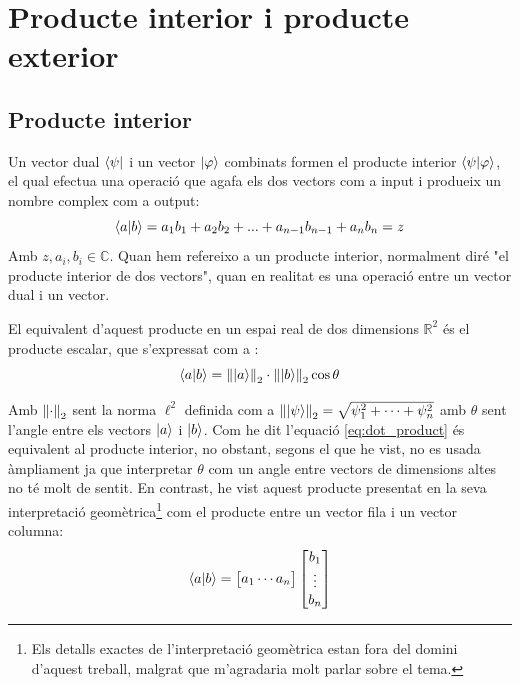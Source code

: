 \section{Producte interior i producte exterior}

\subsection{Producte interior}
Un vector dual $\bra{\psi}$ i un vector $\ket{\varphi}$ combinats formen el producte interior $\bra{\psi}\ket{\varphi}$, el qual efectua una operació que agafa els dos vectors com a input i produeix un nombre complex com a output:
$$
\bra{a}\ket{b} = a_1 b_1 + a_2 b_2 + ... + a_{n-1} b_{n-1} + a_n b_n = z
$$
Amb $z, a_i, b_i \in \mathbb{C}$. Quan hem refereixo a un producte interior, normalment diré "el producte interior de dos vectors", quan en realitat es una operació entre un vector dual i un vector.

El equivalent d'aquest producte en un espai real de dos dimensions $\mathbb{R}^2$ és el producte escalar, que s'expressat com a :
\begin{equation}
	\bra{a}\ket{b} = \norm{\ket{a}}_2 \cdot \norm{\ket{b}}_2 \cos \theta 
	\label{eq:dot_product}
\end{equation}


Amb $\norm{\cdot}_2$ sent la norma $\ell^2$  definida com a $\norm{\ket{\psi}}_2 = \sqrt{\psi_{1}^2 + \cdots + \psi_{n}^2}$ amb $\theta$ sent l'angle entre els vectors $\ket{a}$ i $\ket{b}$. Com he dit l'equació \eqref{eq:dot_product} és equivalent al producte interior, no obstant, segons el que he vist, no es usada àmpliament ja que interpretar $\theta$ com un angle entre vectors de dimensions altes no té molt de sentit. En contrast, he vist aquest producte presentat en la seva interpretació geomètrica\footnote{Els detalls exactes de l'interpretació geomètrica estan fora del domini d'aquest treball, malgrat que m'agradaria molt parlar sobre el tema.} com el producte entre un vector fila i un vector columna: 
$$
\bra{a}\ket{b} = \begin{bmatrix}a_1  \cdots  a_n \end{bmatrix} \begin{bmatrix} b_{1} \\ \vdots \\ b_{n} \end{bmatrix}
$$

